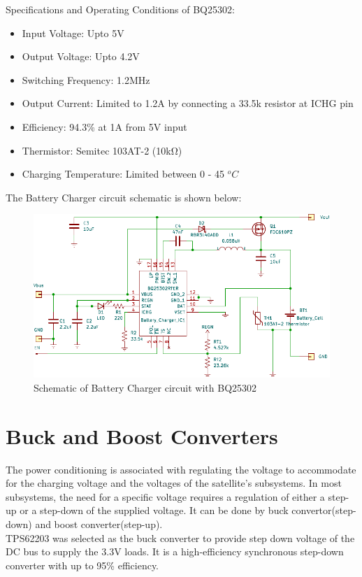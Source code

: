  Specifications and Operating Conditions of BQ25302:
\begin{itemize}
 	\item Input Voltage: Upto 5V
 	\item Output Voltage: Upto 4.2V
 	\item Switching Frequency: 1.2MHz
 	\item Output Current: Limited to 1.2A by connecting a 33.5k resistor at ICHG pin 
 	\item Efficiency: 94.3\% at 1A from 5V input 
 	\item Thermistor: Semitec 103AT-2 (10\si{\kilo\ohm})
 	\item Charging Temperature: Limited between 0 - 45 $^{o}C$
 \end{itemize}

The Battery Charger circuit schematic is shown below:
\begin{figure}[ht]
	\centering
	\includegraphics[width=\columnwidth]{batt2.pdf}
	\caption{Schematic of Battery Charger circuit with BQ25302}
	\label{fig:battch}
\end{figure}


\section[Switching Regulators]{Buck and Boost Converters}
The power conditioning is associated with regulating the voltage to accommodate
for the charging voltage and the voltages of the satellite's subsystems. In most
subsystems, the need for a specific voltage requires a regulation of either a step-up
or a step-down of the supplied voltage. It can be done by buck
convertor(step-down) and boost converter(step-up).\\
TPS62203 was selected as the buck converter to provide step down voltage of the DC bus to supply the 3.3V loads. It is a high-efficiency synchronous step-down converter with up to 95\% efficiency.\\

